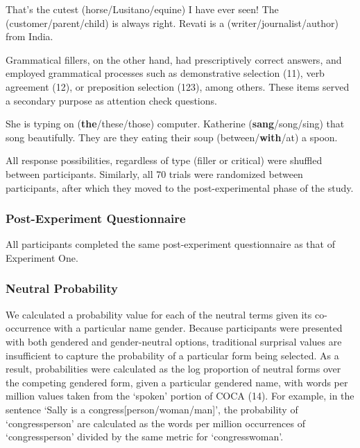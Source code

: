 \documentclass[10pt,letterpaper]{article}
\begin{document}
	\begin{exe}
		\ex That's the cutest (horse/Lusitano/equine) I have ever seen!
		\ex The (customer/parent/child) is always right.
		\ex Revati is a (writer/journalist/author) from India.
	\end{exe}
	
	Grammatical fillers, on the other hand, had prescriptively correct answers, and employed grammatical processes such as demonstrative selection (11), verb agreement (12), or preposition selection (123), among others. These items served a secondary purpose as attention check questions.
	
	\begin{exe}
		\ex She is typing on (\textbf{the}/these/those) computer.
		\ex Katherine (\textbf{sang}/song/sing) that song beautifully. 
		\ex They are they eating their soup (between/\textbf{with}/at) a spoon.
	\end{exe}
	
	All response possibilities, regardless of type (filler or critical) were shuffled between participants.  Similarly, all 70 trials were randomized between participants, after which they moved to the post-experimental phase of the study. 
	
	\subsubsection{Post-Experiment Questionnaire}
	All participants completed the same post-experiment questionnaire as that of Experiment One. 
	
	\subsubsection{Neutral Probability} 
	We calculated a probability value for each of the neutral terms given its co-occurrence with a particular name gender. Because participants were presented with both gendered and gender-neutral options, traditional surprisal values are insufficient to capture the probability of a particular form being selected. As a result, probabilities were calculated as the log proportion of neutral forms over the competing gendered form, given a particular gendered name, with words per million values taken from the `spoken' portion of COCA \parencite{coca} (14). For example, in the sentence `Sally is a congress[person/woman/man]', the probability of `congressperson' are calculated as the words per million occurrences of `congressperson' divided by the same metric for `congresswoman'. 
	
\end{document}
